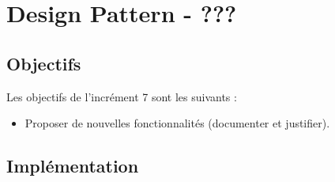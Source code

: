 
\newpage
\section{Design Pattern - ???}

\subsection{Objectifs}

Les objectifs de l'incrément 7 sont les suivants :\\
\begin{itemize}
\item Proposer de nouvelles fonctionnalités (documenter et justifier).\\
\end{itemize}

\subsection{Implémentation}